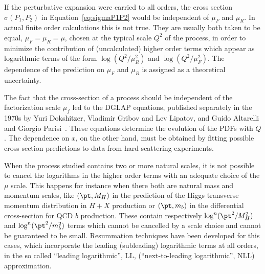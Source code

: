 If the perturbative expansion were carried to all orders, the cross section $\sigma(P_1,P_2)$ in Equation~\ref{eq:sigmaP1P2} would be independent of $\mu_F$ and $\mu_R$. In actual finite order calculations this is not true. They are usually both taken to be equal, $\mu_F=\mu_R=\mu$, chosen at the typical scale $Q^2$ of the process, in order to minimize the contribution of (uncalculated) higher order terms which appear as logarithmic terms of the form $\log(Q^2/\mu^2_R)$ and $\log(Q^2/\mu^2_F)$. The dependence of the prediction on $\mu_F$ and $\mu_R$ is assigned as a theoretical uncertainty.

The fact that the cross-section of a process should be independent of the factorization scale $\mu_f$  led to the  DGLAP equations, published separately in the 1970s by Yuri Dokshitzer, Vladimir Gribov and Lev Lipatov, and Guido Altarelli and Giorgio Parisi~\cite{Altarelli1977298}. These equations determine the evolution of the PDFs with $Q$. The dependence on $x$, on the other hand, must be obtained by fitting possible cross section predictions to data from hard scattering experiments.

When the process studied contains two or more natural scales, it is not possible to cancel the logarithms in the higher order terms with an adequate choice of the $\mu$ scale. This happens for instance when there both are natural mass and momentum scales, like $(\pt,M_H)$ in the prediction of the Higgs transverse momentum distribution in $H+X$ production or $(\pt,m_b)$ in the differential cross-section for QCD $b$ production. These contain respectively $\log^n(\pt^2/M_H^2)$ and $\log^n(\pt^2/m_b^2)$ terms which cannot be cancelled by a scale choice and cannot be guaranteed to be small. Resummation techniques have been developed for this cases, which incorporate the leading (subleading) logarithmic terms at all orders, in the so called  ``leading logarithmic'', LL, (``next-to-leading logarithmic'', NLL) approximation.


